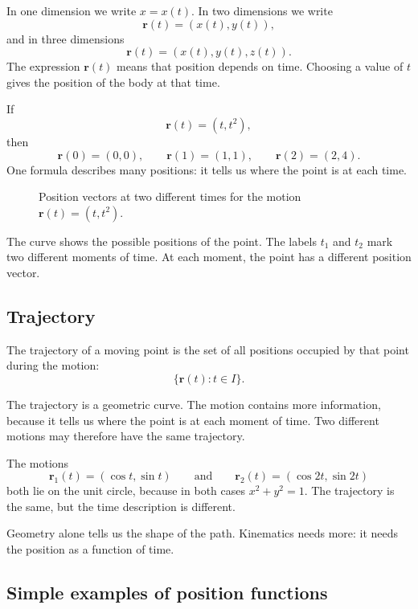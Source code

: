 In one dimension we write \(x=x(t)\). In two dimensions we write
\[
\mathbf{r}(t)=(x(t),y(t)),
\]
and in three dimensions
\[
\mathbf{r}(t)=(x(t),y(t),z(t)).
\]
The expression \(\mathbf{r}(t)\) means that position depends on time. Choosing a value of \(t\) gives the position of the body at that time.

\begin{examplebox}
If
\[
\mathbf{r}(t)=(t,t^2),
\]
then
\[
\mathbf{r}(0)=(0,0),\qquad
\mathbf{r}(1)=(1,1),\qquad
\mathbf{r}(2)=(2,4).
\]
One formula describes many positions: it tells us where the point is at each time.
\end{examplebox}

\begin{figure}[htbp]
\centering

\caption{Position vectors at two different times for the motion \(\mathbf{r}(t)=(t,t^2)\).}
\label{fig:kinematics-position-function-parabola}
\end{figure}

The curve shows the possible positions of the point. The labels \(t_1\) and \(t_2\) mark two different moments of time. At each moment, the point has a different position vector.

\subsection{Trajectory}

\begin{definitionbox}
The trajectory of a moving point is the set of all positions occupied by that point during the motion:
\[
\{\mathbf{r}(t):t\in I\}.
\]
\end{definitionbox}

The trajectory is a geometric curve. The motion contains more information, because it tells us where the point is at each moment of time. Two different motions may therefore have the same trajectory.

\begin{examplebox}
The motions
\[
\mathbf{r}_1(t)=(\cos t,\sin t)
\qquad\text{and}\qquad
\mathbf{r}_2(t)=(\cos 2t,\sin 2t)
\]
both lie on the unit circle, because in both cases \(x^2+y^2=1\). The trajectory is the same, but the time description is different.
\end{examplebox}

Geometry alone tells us the shape of the path. Kinematics needs more: it needs the position as a function of time.

\subsection{Simple examples of position functions}

